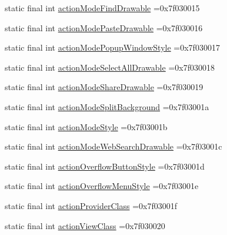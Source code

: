 \begin{DoxyCompactItemize}
static final int \mbox{\hyperlink{classcom_1_1example_1_1trainawearapplication_1_1_r_1_1attr_aa4ec155d8fccfdb751555e622a1d5ddb}{action\+Mode\+Find\+Drawable}} =0x7f030015
\item 
static final int \mbox{\hyperlink{classcom_1_1example_1_1trainawearapplication_1_1_r_1_1attr_aac436a8a5352c1a44164b012e86cd7f9}{action\+Mode\+Paste\+Drawable}} =0x7f030016
\item 
static final int \mbox{\hyperlink{classcom_1_1example_1_1trainawearapplication_1_1_r_1_1attr_a901b714797e3449fee6fed8c2c1e31fd}{action\+Mode\+Popup\+Window\+Style}} =0x7f030017
\item 
static final int \mbox{\hyperlink{classcom_1_1example_1_1trainawearapplication_1_1_r_1_1attr_a13811bc616b01f241e21291564236e9b}{action\+Mode\+Select\+All\+Drawable}} =0x7f030018
\item 
static final int \mbox{\hyperlink{classcom_1_1example_1_1trainawearapplication_1_1_r_1_1attr_aa1ead34c5ee8d32f462768b4be08a26b}{action\+Mode\+Share\+Drawable}} =0x7f030019
\item 
static final int \mbox{\hyperlink{classcom_1_1example_1_1trainawearapplication_1_1_r_1_1attr_ab0cd8a67acbcc219fb6e8f64e1bef764}{action\+Mode\+Split\+Background}} =0x7f03001a
\item 
static final int \mbox{\hyperlink{classcom_1_1example_1_1trainawearapplication_1_1_r_1_1attr_ae18c970d339cf6b793b47eddc5ffe7a5}{action\+Mode\+Style}} =0x7f03001b
\item 
static final int \mbox{\hyperlink{classcom_1_1example_1_1trainawearapplication_1_1_r_1_1attr_a1611b97df568c3837f805e88844057f2}{action\+Mode\+Web\+Search\+Drawable}} =0x7f03001c
\item 
static final int \mbox{\hyperlink{classcom_1_1example_1_1trainawearapplication_1_1_r_1_1attr_a9eb889e4707a8cb14a5fd0233f21f2cd}{action\+Overflow\+Button\+Style}} =0x7f03001d
\item 
static final int \mbox{\hyperlink{classcom_1_1example_1_1trainawearapplication_1_1_r_1_1attr_a45b1d23394b05195fc175e9ec97f7a70}{action\+Overflow\+Menu\+Style}} =0x7f03001e
\item 
static final int \mbox{\hyperlink{classcom_1_1example_1_1trainawearapplication_1_1_r_1_1attr_aac67c6b5c8a53d8571519c54fff28a10}{action\+Provider\+Class}} =0x7f03001f
\item 
static final int \mbox{\hyperlink{classcom_1_1example_1_1trainawearapplication_1_1_r_1_1attr_a38c265794b2c879a8743e90b59affd60}{action\+View\+Class}} =0x7f030020
\item 

\end{DoxyCompactItemize}
